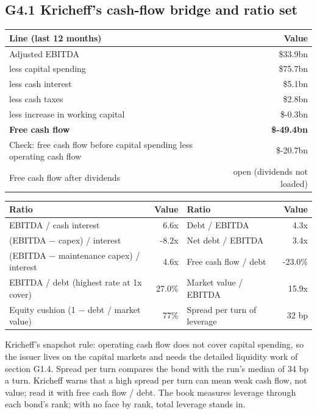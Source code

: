 \documentclass[11pt,a4paper]{article}
\begin{document}
\subsection*{G4.1 Kricheff's cash-flow bridge and ratio set}
\begin{center}\footnotesize\setlength{\tabcolsep}{3.5pt}\begin{tabular}{@{}lr@{}}\toprule
Line (last 12 months) & Value \\\midrule
Adjusted EBITDA & \$33.9bn \\
less capital spending & \$75.7bn \\
less cash interest & \$5.1bn \\
less cash taxes & \$2.8bn \\
less increase in working capital & \$-0.3bn \\
\textbf{Free cash flow} & \textbf{\$-49.4bn} \\
Check: free cash flow before capital spending less operating cash flow & \$-20.7bn \\
Free cash flow after dividends & open (dividends not loaded) \\
\bottomrule\end{tabular}\end{center}
\begin{center}\footnotesize\setlength{\tabcolsep}{3.5pt}\begin{tabular}{@{}lrlr@{}}\toprule
Ratio & Value & Ratio & Value \\\midrule
EBITDA / cash interest & 6.6x & Debt / EBITDA & 4.3x \\
(EBITDA $-$ capex) / interest & -8.2x & Net debt / EBITDA & 3.4x \\
(EBITDA $-$ maintenance capex) / interest & 4.6x & Free cash flow / debt & -23.0\% \\
EBITDA / debt (highest rate at 1x cover) & 27.0\% & Market value / EBITDA & 15.9x \\
Equity cushion (1 $-$ debt / market value) & 77\% & Spread per turn of leverage & 32 bp \\
\bottomrule\end{tabular}\end{center}
Kricheff's snapshot rule: operating cash flow does not cover capital spending, so the issuer lives on the capital markets and needs the detailed liquidity work of section G1.4. Spread per turn compares the bond with the run's median of 34 bp a turn. Kricheff warns that a high spread per turn can mean weak cash flow, not value; read it with free cash flow / debt. The book measures leverage through each bond's rank; with no face by rank, total leverage stands in.
\end{document}
